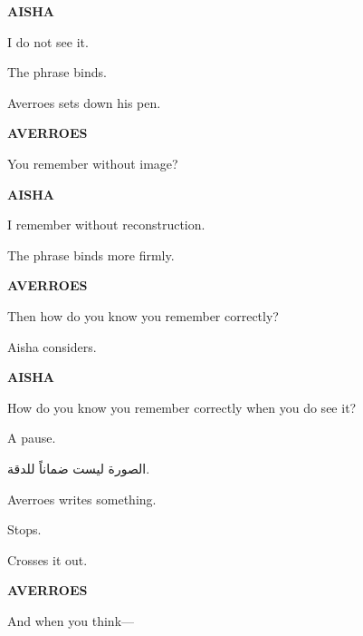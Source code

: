 \medskip

\textbf{AISHA}

I do not see it.

\medskip


\medskip

The phrase binds.

\medskip

Averroes sets down his pen.

\medskip

\textbf{AVERROES}

You remember without image?

\medskip

\textbf{AISHA}

I remember without reconstruction.

\medskip


\medskip

The phrase binds more firmly.

\medskip


\medskip

\textbf{AVERROES}

Then how do you know you remember correctly?

\medskip

Aisha considers.

\medskip

\textbf{AISHA}

How do you know you remember correctly when you do see it?

\medskip

A pause.

\medskip

\begin{AR}
الصورة ليست ضماناً للدقة.
\end{AR}

\medskip

Averroes writes something.

Stops.

Crosses it out.

\medskip

\textbf{AVERROES}

And when you think---

